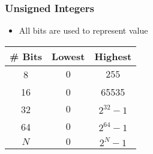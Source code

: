 \begin{frame}
  \frametitle{Unsigned Integers}
  \begin{itemize}
    \item All bits are used to represent value
  \end{itemize}
  \begin{center}
  \end{center}
  \begin{center}
    \begin{tabular}{ccc}
      \toprule
      \textbf{\# Bits} & \textbf{Lowest} & \textbf{Highest} \\
      \midrule
      8 & $0$ & $255$ \\
      16 & \num{0} & \num{65535} \\
      32 & $0$ & $2^{32}-1$ \\
      64 & $0$ & $2^{64}-1$ \\
      $N$ & $0$ & $2^{N}-1$ \\
      \bottomrule
    \end{tabular}
  \end{center}
\end{frame}


